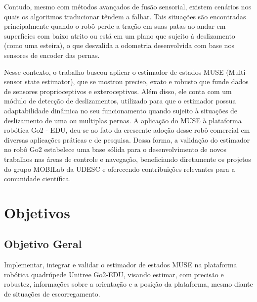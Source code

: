 Contudo, mesmo com métodos avançados de fusão sensorial, existem cenários nos quais os algoritmos traducionar têndem a falhar. Tais situações são encontradas principalmente quando o robô perde a tração em suas patas ao andar em superfícies com baixo atrito ou está em um plano que sujeito à deslizamento (como uma esteira), o que desvalida a odometria desenvolvida com base nos sensores de encoder das pernas. 

Nesse contexto, o trabalho buscou aplicar o estimador de estados MUSE (Multi-sensor state estimator), que se mostrou preciso, exato e robusto que funde dados de sensores proprioceptivos e exteroceptivos. Além disso, ele conta com um módulo de detecção de deslizamentos, utilizado para que o estimador possua adaptabilidade dinâmica no seu funcionamento quando sujeito à situações de deslizamento de uma ou multiplas pernas. A aplicação do MUSE à plataforma robótica Go2 - EDU, deu-se ao fato da crescente adoção desse robô comercial em diversas aplicações práticas e de pesquisa. Dessa forma, a validação do estimador no robô Go2 estabelece uma base sólida para o desenvolvimento de novos trabalhos nas áreas de controle e navegação, beneficiando diretamente os projetos do grupo MOBILab da UDESC e oferecendo contribuições relevantes para a comunidade científica.



\section{Objetivos}

\subsection{Objetivo Geral}
Implementar, integrar e validar o estimador de estados MUSE na plataforma robótica quadrúpede Unitree Go2-EDU, visando estimar, com precisão e robustez, informações sobre a orientação e a posição da plataforma, mesmo diante de situações de escorregamento.

